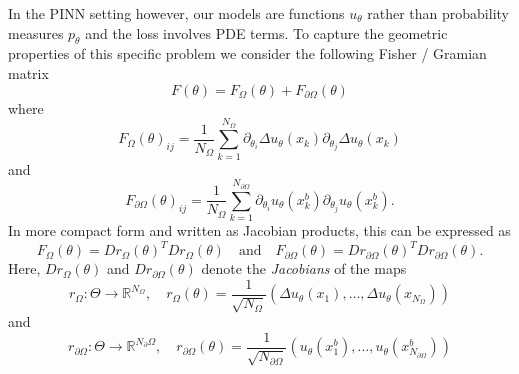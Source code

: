In the PINN setting however, our models are functions $u_\theta$ rather than probability measures $p_\theta$ and the loss involves PDE terms.
To capture the geometric properties of this specific problem we consider the following Fisher / Gramian matrix %
\begin{equation*}
  F(\theta) = F_\Omega(\theta) + F_{\partial\Omega}(\theta)
\end{equation*}
where
\begin{equation}\label{eq:FisherInterior}
  F_\Omega(\theta)_{ij} = \frac1{{N_\Omega}} \sum_{k=1}^{N_\Omega} \partial_{\theta_i} \Delta u_\theta(x_k) \partial_{\theta_j} \Delta u_\theta(x_k)
\end{equation}
and
\begin{equation}
  F_{\partial\Omega}(\theta)_{ij} = \frac1{{N_\Omega}} \sum_{k=1}^{N_{\partial\Omega}} \partial_{\theta_i} u_\theta(x_k^b) \partial_{\theta_j} u_\theta (x_k^b).
\end{equation}
In more compact form and written as Jacobian products, this can be expressed as
\begin{equation}\label{eq:Jacobian_Fischer}
  F_\Omega(\theta) = Dr_\Omega(\theta)^T Dr_\Omega(\theta)
  \quad \text{and} \quad
  F_{\partial\Omega}(\theta) = Dr_{\partial\Omega}(\theta)^T Dr_{\partial\Omega}(\theta).
\end{equation}
Here, $Dr_\Omega(\theta)$ and $Dr_{\partial\Omega}(\theta)$  denote the \emph{Jacobians} of the maps
\begin{equation*}
  r_{\Omega}\colon \Theta \to \mathbb{R}^{N_\Omega}, \quad r_{\Omega}(\theta) = \frac{1}{\sqrt{N_{\Omega}}}(\Delta u_\theta(x_1), \dots, \Delta u_\theta(x_{N_{\Omega}}))
\end{equation*}
and
\begin{equation*}
  r_{\partial\Omega}\colon \Theta \to \mathbb{R}^{{N_\partial\Omega}}, \quad r_{\partial\Omega}(\theta) = \frac{1}{\sqrt{N_{\partial\Omega}}}(u_\theta(x^b_1), \dots, u_\theta(x^b_{N_{\partial\Omega}}))
\end{equation*}

